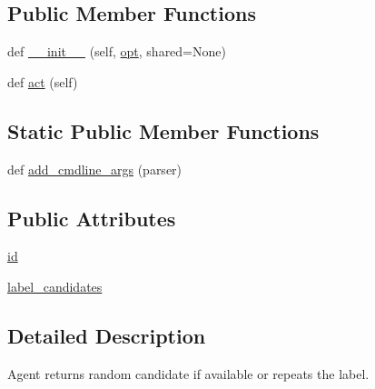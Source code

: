 \subsection*{Public Member Functions}
\begin{DoxyCompactItemize}
\item 
def \hyperlink{classparlai_1_1agents_1_1random__candidate_1_1random__candidate_1_1RandomCandidateAgent_a3c2a96128e8a9825e552d6e999e55490}{\+\_\+\+\_\+init\+\_\+\+\_\+} (self, \hyperlink{classparlai_1_1core_1_1agents_1_1Agent_ab3b45d2754244608c75d4068b90cd051}{opt}, shared=None)
\item 
def \hyperlink{classparlai_1_1agents_1_1random__candidate_1_1random__candidate_1_1RandomCandidateAgent_acb0a6e3c223f9e784a668d24b3e7fc82}{act} (self)
\end{DoxyCompactItemize}
\subsection*{Static Public Member Functions}
\begin{DoxyCompactItemize}
\item 
def \hyperlink{classparlai_1_1agents_1_1random__candidate_1_1random__candidate_1_1RandomCandidateAgent_adf32b766729393efc5fbdffee363f75a}{add\+\_\+cmdline\+\_\+args} (parser)
\end{DoxyCompactItemize}
\subsection*{Public Attributes}
\begin{DoxyCompactItemize}
\item 
\hyperlink{classparlai_1_1agents_1_1random__candidate_1_1random__candidate_1_1RandomCandidateAgent_adc2ff06b9b7e9463dc00dfa227fdc7d6}{id}
\item 
\hyperlink{classparlai_1_1agents_1_1random__candidate_1_1random__candidate_1_1RandomCandidateAgent_abd4570210c517ac8da9f269f8302f228}{label\+\_\+candidates}
\end{DoxyCompactItemize}


\subsection{Detailed Description}
\begin{DoxyVerb}Agent returns random candidate if available or repeats the label.
\end{DoxyVerb}
 

